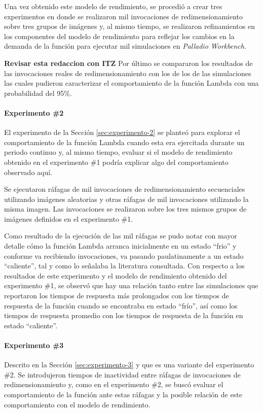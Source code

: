 Una vez obtenido este modelo de rendimiento, se procedió a crear tres experimentos en donde se realizaron mil invocaciones de redimensionamiento sobre tres grupos de imágenes y, al mismo tiempo, se realizaron refinamientos en los componentes del modelo de rendimiento para reflejar los cambios en la demanda de la función para ejecutar mil simulaciones en \emph{Palladio Workbench}.

\textbf{Revisar esta redaccion con ITZ}
Por último se compararon los resultados de las invocaciones reales de redimensionamiento con los de los de las simulaciones las cuales pudieron caracterizar el comportamiento de la función Lambda con una probabilidad del 95\%. 

\paragraph{Experimento \#2} El experimento de la Sección \ref{sec:experimento-2} se planteó para explorar el comportamiento de la función Lambda cuando esta era ejercitada durante un periodo continuo y, al mismo tiempo, evaluar si el modelo de rendimiento obtenido en el experimento \#1 podría explicar algo del comportamiento observado aquí.

Se ejecutaron ráfagas de mil invocaciones de redimensionamiento secuenciales utilizando imágenes aleatorias y otras ráfagas de mil invocaciones utilizando la misma imagen. Las invocaciones se realizaron sobre los tres mismos grupos de imágenes definidos en el experimento \#1.

Como resultado de la ejecución de las mil ráfagas se pudo notar con mayor detalle cómo la función Lambda arranca inicialmente en un estado ``frio'' y conforme va recibiendo invocaciones, va pasando paulatinamente a un estado ``caliente'', tal y como lo señalaba la literatura consultada. Con respecto a los resultados de este experimento y el modelo de rendimiento obtenido del experimento \#1, se observó que hay una relación tanto entre las simulaciones que reportaron los tiempos de respuesta más prolongados con los tiempos de respuesta de la función cuando se encontraba en estado ``frío'', así como los tiempos de respuesta promedio con los tiempos de respuesta de la función en estado ``caliente''.

\paragraph{Experimento \#3} Descrito en la Sección \ref{sec:experimento-3} y que es una variante del experimento \#2. Se introdujeron tiempos de inactividad entre ráfagas de invocaciones de redimensionamiento y, como en el experimento \#2, se buscó evaluar el comportamiento de la función ante estas ráfagas y la posible relación de este comportamiento con el modelo de rendimiento.

